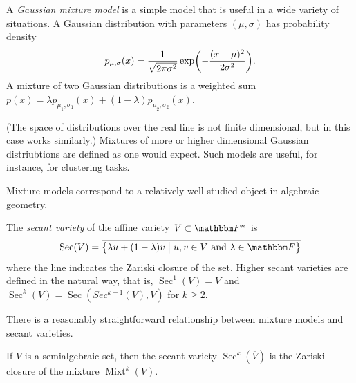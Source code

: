 \documentclass[11pt,titlepage]{article}
\newcommand*{\vbar}{\;\big\vert\;}
\DeclareMathOperator{\Mixt}{Mixt}
\DeclareMathOperator{\Sec}{Sec}
\numberwithin{equation}{section}
\begin{document}
    \begin{example}
    A \emph{Gaussian mixture model} is a simple model that is useful in a wide
    variety of situations.  A Gaussian distribution with parameters $(\mu,
    \sigma)$ has probability density
    \[
        p_{\mu, \sigma}(x) = \frac{1}{\sqrt{2\pi\sigma^2}} 
        \exp\pdil*{-\frac{(x - \mu)^2}{2\sigma^2}}.
    \]
    A mixture of two Gaussian distributions is a weighted sum $p(x) = \lambda
    p_{\mu_1, \sigma_1}(x) + (1 - \lambda)p_{\mu_2, \sigma_2}(x)$.  
    \begin{center}
    \end{center}
    (The space of distributions over the real line is not finite dimensional,
    but in this case works similarly.) Mixtures of more or higher dimensional
    Gaussian distriubtions are defined as one would expect.  Such models are
    useful, for instance, for clustering tasks.
    \end{example}

    Mixture models correspond to a relatively well-studied object in algebraic
    geometry.
    \begin{definition}
    The \emph{secant variety} of the affine variety $V \subset \F^n$ is
    \[
        \Sec(V) = \overline{\cdil[\big]{
        \lambda u + (1 - \lambda) v \vbar
        u,v \in V
        \text{ and }
        \lambda \in \F
        }}
    \]
    where the line indicates the Zariski closure of the set.  Higher secant
    varieties are defined in the natural way, that is, $\Sec^1(V) = V$ and
    $\Sec^k(V) = \Sec(Sec^{k-1}(V), V)$ for $k \ge 2$.
    \end{definition}

    There is a reasonably straightforward relationship between mixture models
    and secant varieties.
    \begin{proposition}
    If $V$ is a semialgebraic set, then the secant variety
    $\Sec^k(\overline{V})$ is the Zariski closure of the mixture $\Mixt^k(V)$.
    \end{proposition}
\end{document}
